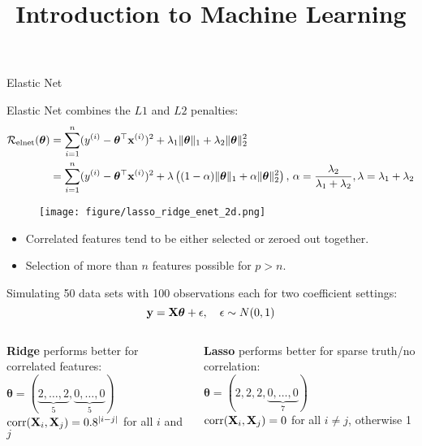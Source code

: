 \documentclass[11pt,compress,t,notes=noshow, xcolor=table]{beamer}
\title{Introduction to Machine Learning}
\date{}
\begin{document}




\begin{vbframe} {Elastic Net}


Elastic Net  combines the $L1$ and $L2$ penalties:
\small{
\begin{align*}
\mathcal{R}_{\text{elnet}}(\bm{\theta}) &=  \sum\limits_{i=1}^n (y^{(i)} - \bm{\theta}^\top \mathbf{x}^{(i)})^2 + \lambda_1 \|\bm{\theta}\|_1 + \lambda_2 \|\bm{\theta}\|_2^2 \\
&= \sum\limits_{i=1}^n (y^{(i)} - \bm{\theta}^\top \mathbf{x}^{(i)})^2 + \lambda \left( (1-\alpha) \|\bm{\theta}\|_1 + \alpha \|\bm{\theta}\|_2^2\right),\, \alpha=\frac{\lambda_2}{\lambda_1+\lambda_2}, \lambda=\lambda_1+\lambda_2
\end{align*}}
\begin{figure}
\texttt{[image: figure/lasso\_ridge\_enet\_2d.png]}\\
\end{figure}
\vspace{-0.2cm}
\begin{itemize}
\item Correlated features tend to be either selected or zeroed out together.
\item Selection of more than $n$ features possible for $p>n$.
\end{itemize}


\framebreak
\footnotesize
Simulating 50 data sets with 100 observations each for two coefficient settings: \\
\vspace{-0.3cm}
$$\mathbf{y} =\mathbf{X} \boldsymbol{\theta}+ \epsilon, \quad \epsilon \sim N(0,1)$$
\vspace{-0.3cm}
\begin{columns}
\begin{column}{0.5\textwidth}
\begin{center}
{\footnotesize \textbf{Ridge} performs better for correlated features}: \\ 
$\boldsymbol{\theta}=(\underbrace{2,\ldots,2}_{5},\underbrace{0,\ldots,0}_{5})$\\
$ \operatorname{corr}(\mathbf{X}_{i},\mathbf{X}_{j})=0.8^{|i-j|}$ for all $i$ and $j$
  \end{center}
\end{column}
\begin{column}{0.5\textwidth} 
\begin{center}
{\footnotesize \textbf{Lasso} performs better for sparse truth/no correlation:} \\
$\boldsymbol{\theta}=(2, 2, 2,\underbrace{0,\ldots,0}_{7})$ \\
$\operatorname{corr}(\mathbf{X}_{i},\mathbf{X}_{j})= 0$ for all $i \neq j$, otherwise 1
\end{center}
\end{column}
\end{columns}


\end{vbframe}
\end{document}
